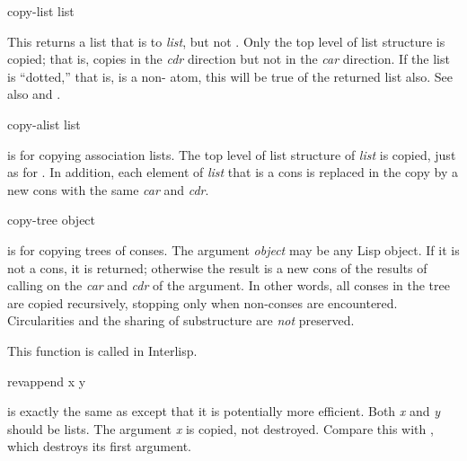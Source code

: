 \begin{defun}[Function]
copy-list list

This returns a list that is  to {\it list}, but not .
Only the top level of list structure is copied; that is, 
copies in the {\it cdr} direction but not in the {\it car} direction.
If the list is ``dotted,'' that is, 
is a non-{\nil} atom, this will be true of the returned list also.
See also  and .
\end{defun}

\begin{defun}[Function]
copy-alist list

 is for copying association lists.  The top level of
list structure of {\it list} is copied, just as for .
In addition, each element of {\it list} that is a cons is replaced
in the copy by a new cons with the same {\it car} and {\it cdr}.
\end{defun}

\begin{defun}[Function]
copy-tree object

 is for copying trees of conses.
The argument {\it object} may be any Lisp object.
If it is not a cons, it is returned; otherwise
the result is a new cons of the results of calling 
on the {\it car} and {\it cdr} of the argument.  In other words,
all conses in the tree are copied recursively, stopping
only when non-conses are encountered.
Circularities and the sharing of substructure are {\it not} preserved.

\beforenoterule
\begin{incompatibility}
This function is called  in Interlisp.
\end{incompatibility}
\afternoterule
\end{defun}

\begin{defun}[Function]
revappend x y

 is exactly the same as 
 except that it is potentially more
efficient.  Both {\it x} and {\it y} should be lists.
The argument {\it x} is copied, not destroyed.
Compare this with , which destroys its first argument.
\end{defun}

